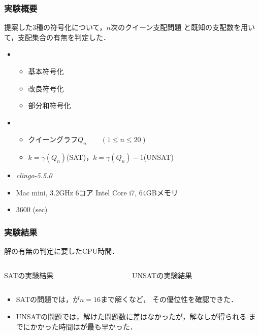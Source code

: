 \documentclass[dvipdfmx,10pt]{beamer}
\begin{document}
\begin{frame}\frametitle{実験概要}
 \begin{block}{}
  提案した3種の符号化について，$n$次のクイーン支配問題
  と既知の支配数を用いて，支配集合の有無を判定した．
 \end{block}
 \begin{itemize}
  \item {}
	\begin{itemize}
	 \item 基本符号化
	 \item 改良符号化
	 \item 部分和符号化
	\end{itemize}
  \item {}
	\begin{itemize}
	 \item クイーングラフ$Q_{n} \qquad (1 \leq n \leq 20)$
	 \item $k=\gamma(Q_{n})$\quad (SAT)，$k=\gamma(Q_{n})-1$\quad (UNSAT)
	\end{itemize}
  \item {} \textit{clingo-5.5.0}
  \item {} Mac mini, 3.2GHz 6コア Intel Core i7, 64GBメモリ
  \item {} 3600 (sec)
 \end{itemize}
\end{frame}

%
%

\begin{frame}\frametitle{実験結果}
 \begin{block}{}
  解の有無の判定に要したCPU時間．
 \end{block}
 \begin{columns}
  \begin{column}{0.50\textwidth}
   \begin{table}[htbp]
    \caption{SATの実験結果}
    \scalebox{0.7}{
    }
   \end{table}
  \end{column}
  \begin{column}{0.50\textwidth}
   \begin{table}[htbp]
    \caption{UNSATの実験結果}
    \scalebox{0.7}{
    }
   \end{table}
  \end{column}
 \end{columns} 
 \begin{itemize}
  \item SATの問題では，が$n=16$まで解くなど，
	その優位性を確認できた．
  \item UNSATの問題では，解けた問題数に差はなかったが，解なしが得られる
	までにかかった時間はが最も早かった．
 \end{itemize}
\end{frame}
\end{document}

